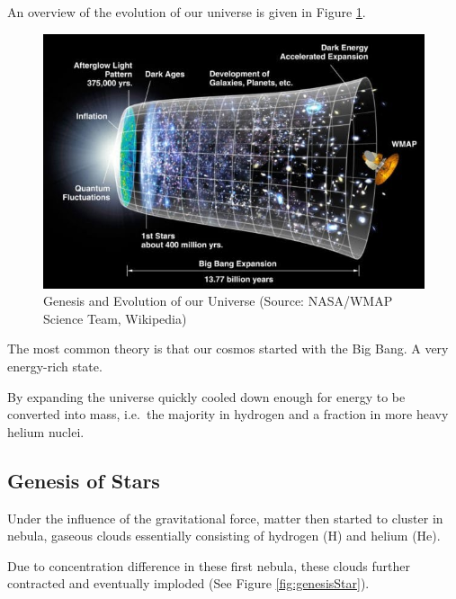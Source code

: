 \documentclass[
  11pt,
]{book}
\begin{document}
An overview of the evolution of our universe is given in Figure \ref{fig:evolutionUniverse}.

\begin{figure}

{\centering \includegraphics[width=1\linewidth]{./figs/originKosmos} 

}

\caption{Genesis and Evolution of our Universe (Source: NASA/WMAP Science Team, Wikipedia)}\label{fig:evolutionUniverse}
\end{figure}

The most common theory is that our cosmos started with the Big Bang.
A very energy-rich state.

By expanding the universe quickly cooled down enough for energy to be converted into mass, i.e.~the majority in hydrogen and a fraction in more heavy helium nuclei.

\hypertarget{genesis-of-stars}{%
\subsection{Genesis of Stars}\label{genesis-of-stars}}

Under the influence of the gravitational force, matter then started to cluster in nebula, gaseous clouds essentially consisting of hydrogen (H) and helium (He).

Due to concentration difference in these first nebula, these clouds further contracted and eventually imploded (See Figure \ref{fig:genesisStar}).
\end{document}
